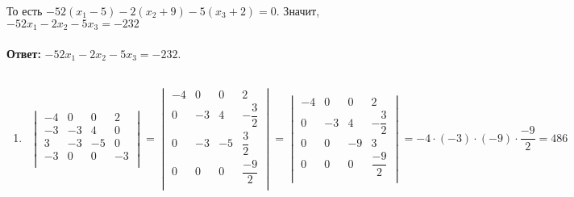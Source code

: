 		То есть $-52(x_{1} - 5) - 2(x_{2} + 9) - 5(x_{3} + 2) = 0$. Значит, $-52x_{1} - 2x_{2} - 5x_{3} = -232$\\
		\\
		\textbf{Ответ:} $-52x_{1} - 2x_{2} - 5x_{3} = -232$. 
		
		
		
		\subsection{}
		\begin{enumerate}
		\item 
			\begin{gather*}
				\begin{vmatrix}
					-4 & 0 & 0 & 2\\
					-3 & -3 & 4 & 0\\
					3 & -3 & -5 & 0\\
					-3 & 0 & 0 & -3\\
				\end{vmatrix}
				=
				\begin{vmatrix}
					-4 & 0 & 0 & 2\\
					0 & -3 & 4 & -\dfrac{3}{2}\\
					0 & -3 & -5 & \dfrac{3}{2}\\
					0 & 0 & 0 & \dfrac{-9}{2}\\
				\end{vmatrix}
				=
				\begin{vmatrix}
					-4 & 0 & 0 & 2\\
					0 & -3 & 4 & -\dfrac{3}{2}\\
					0 & 0 & -9 & 3\\
					0 & 0 & 0 & \dfrac{-9}{2}\\
				\end{vmatrix}
				= -4 \cdot (-3) \cdot (-9) \cdot \dfrac{-9}{2} = 486
			\end{gather*}
			

\end{enumerate}
